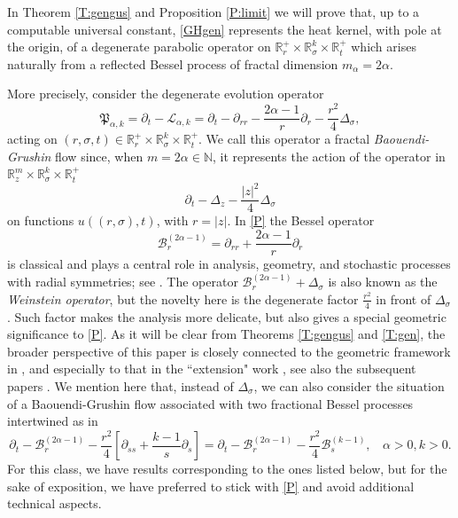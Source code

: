 \documentclass[11pt,a4paper]{amsart}
\def \R {\mathbb{R}}
\newcommand{\Barr}{\mathscr B_r^{(2\alpha-1)}}
\newcommand{\Rm}{\mathbb R^m}
\newcommand{\p}{\partial}
\numberwithin{equation}{section}
\numberwithin{equation}{section}
\begin{document}
In Theorem \ref{T:gengus} and Proposition \ref{P:limit} we will prove that, up to a computable universal constant, \eqref{GHgen} represents the heat kernel, with pole at the origin, of a degenerate parabolic operator on $\R^+_r\times \R^k_\sigma\times \R^+_t$ which arises naturally from a reflected Bessel process of fractal dimension $m_\alpha = 2\alpha$.

More precisely, consider the degenerate evolution operator
\begin{equation}\label{P}
\mathfrak P_{\alpha,k}=\partial_t-\mathscr L_{\alpha,k}
  = \partial_t - \partial_{rr}
    - \frac{2\alpha-1}{r}\partial_r
    - \frac{r^2}{4}\Delta_\sigma,
\end{equation}
acting on $(r,\sigma,t)\in \R^+_r\times \R^k_\sigma\times \R^+_t$. We call this operator a fractal \emph{Baouendi-Grushin} flow since, when $m = 2\alpha\in \mathbb N$, it represents the action of the operator in $\Rm_z\times \R^k_\sigma\times \R^+_t$
\[
\p_t - \Delta_z - \frac{|z|^2}{4}\Delta_\sigma
\]
on functions $u((r,\sigma),t)$, with $r = |z|$.
In \eqref{P} the Bessel operator
\[
\Barr = \partial_{rr} + \frac{2\alpha-1}{r}\partial_r
\]
is classical and plays a central role in analysis, geometry, and stochastic processes with radial symmetries; see \cite{We1, We, We2, MS, Ta, MO, IM, KT, CS, GVjfa, GVacv}. The operator $\Barr + \Delta_\sigma$ is also known as the \emph{Weinstein operator}, but the novelty here is the degenerate factor $\frac{r^2}{4}$ in front of $\Delta_\sigma$. Such factor makes the analysis more delicate, but also gives a special geometric significance to \eqref{P}. As it will be clear from Theorems \ref{T:gengus} and \ref{T:gen}, the broader perspective of this paper is closely connected to the geometric framework in \cite{BOO}, and especially to that in the ``extension" work \cite{FGMT}, see also the subsequent papers \cite{RTaim, MOZjga, MOZ, RT, FOZ, GTjam, GTpotan}. We mention here that, instead of $\Delta_\sigma$, we can also consider the situation of a Baouendi-Grushin flow associated with two fractional Bessel processes intertwined as in 
\[
\p_t - \Barr - \frac{r^2}{4} \left[\p_{ss} + \frac{k-1}s \p_s\right] = \p_t - \Barr - \frac{r^2}{4} \mathscr B_s^{(k-1)},\ \ \ \ \alpha>0, k>0.
\]   
For this class, we have results corresponding to the ones listed below, but for the sake of exposition, we have preferred to stick with \eqref{P} and avoid additional technical aspects.
 
\end{document}
